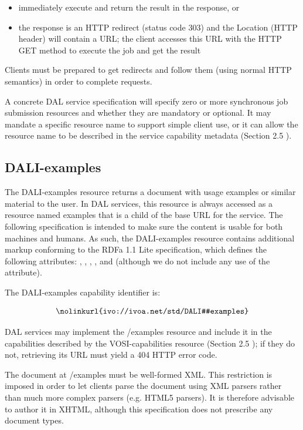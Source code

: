 \documentclass[11pt,letter]{ivoa}
\begin{document}
\begin{itemize}
\item immediately execute and return the result in the response, or 
\item the response is an HTTP redirect (status code 303) and the Location (HTTP 
header) will contain a URL; the client accesses this URL with the HTTP GET 
method to execute the job and get the result 
\end{itemize}

Clients must be prepared to get redirects and follow them (using normal HTTP 
semantics) in order to complete requests.

A concrete DAL service specification will specify zero or more synchronous job 
submission resources and whether they are mandatory or optional. It may mandate 
a specific resource name to support simple client use, or it can allow the 
resource name to be described in the service capability metadata (Section 2.5 ).

\subsection{DALI-examples}
\label{sec:dali-examples}
The DALI-examples resource returns a document with usage examples or similar 
material to the user. In DAL services, this resource is always accessed as a 
resource named examples that is a child of the base URL for the service. The 
following specification is intended to make sure the content is usable for both 
machines and humans. As such, the DALI-examples resource contains additional 
markup conforming to the RDFa 1.1 Lite \citep{std:RDFaLite11} specification, 
which defines the 
following attributes: , , ,
, and  (although we 
do not include any use of the  attribute).

The DALI-examples capability identifier is:

$$
\hbox{\nolinkurl{ivo://ivoa.net/std/DALI#examples}}
$$

DAL services may implement the /examples resource and include it in the 
capabilities described by the VOSI-capabilities resource (Section 2.5 ); if they 
do not, retrieving its URL must yield a 404 HTTP error code.

The document at /examples must be well-formed XML. This restriction is imposed 
in order to let clients parse the document using XML parsers rather than 
much more complex parsers (e.g. HTML5 parsers). It is therefore advisable to 
author it in XHTML, although this specification does not prescribe any document 
types.
\end{document}

